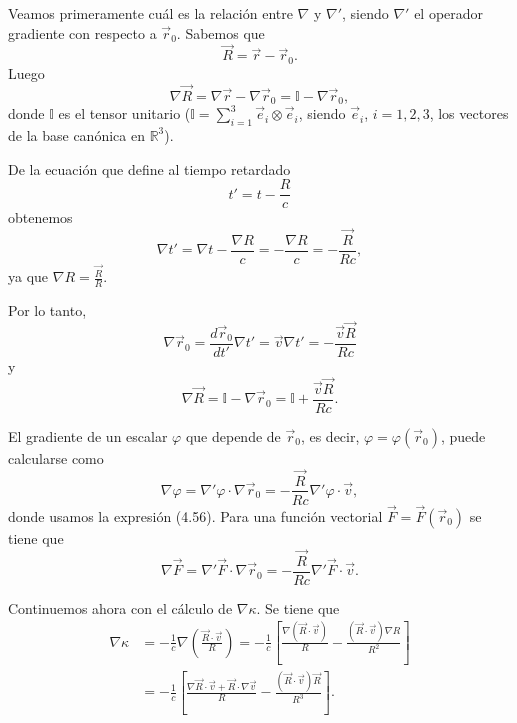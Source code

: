 \documentclass[12pt,a4paper]{book}
\begin{document}
Veamos primeramente cuál es la relación entre $\nabla$ y $\nabla'$, siendo $\nabla'$ el operador gradiente con respecto a $\vec{r}_0$. Sabemos que
\begin{equation}
\vec{R} = \vec{r} - \vec{r}_0.
\end{equation}
Luego
\begin{equation}
\nabla\vec{R} = \nabla\vec{r} - \nabla\vec{r}_0 = \mathbb{I} - \nabla\vec{r}_0,
\end{equation}
donde $\mathbb{I}$ es el tensor unitario ($\mathbb{I} = \sum_{i=1}^3 \vec{e}_i \otimes \vec{e}_i$, siendo $\vec{e}_i$, $i = 1, 2, 3$, los vectores de la base canónica en $\mathbb{R}^3$). 

De la ecuación que define al tiempo retardado
\begin{equation}
t' = t - \frac{R}{c}
\end{equation}
obtenemos
\begin{equation}
\nabla t' = \nabla t - \frac{\nabla R}{c} = -\frac{\nabla R}{c} = -\frac{\vec{R}}{Rc},
\end{equation}
ya que $\nabla R = \frac{\vec{R}}{R}$.

Por lo tanto,
\begin{equation}
\nabla\vec{r}_0 = \frac{d\vec{r}_0}{dt'}\nabla t' = \vec{v}\nabla t' = -\frac{\vec{v}\vec{R}}{Rc}
\end{equation}
y
\begin{equation}
\nabla\vec{R} = \mathbb{I} - \nabla\vec{r}_0 = \mathbb{I} + \frac{\vec{v}\vec{R}}{Rc}.
\end{equation}

El gradiente de un escalar $\varphi$ que depende de $\vec{r}_0$, es decir, $\varphi = \varphi(\vec{r}_0)$, puede calcularse como
\begin{equation}
\nabla\varphi = \nabla'\varphi \cdot \nabla\vec{r}_0 = -\frac{\vec{R}}{Rc}\nabla'\varphi \cdot \vec{v},
\end{equation}
donde usamos la expresión (4.56). Para una función vectorial $\vec{F} = \vec{F}(\vec{r}_0)$ se tiene que
\begin{equation}
\nabla\vec{F} = \nabla'\vec{F} \cdot \nabla\vec{r}_0 = -\frac{\vec{R}}{Rc}\nabla'\vec{F} \cdot \vec{v}.
\end{equation}

Continuemos ahora con el cálculo de $\nabla\kappa$. Se tiene que
\begin{align}
\nabla\kappa &= -\frac{1}{c}\nabla\left(\frac{\vec{R} \cdot \vec{v}}{R}\right) = -\frac{1}{c}\left[\frac{\nabla(\vec{R} \cdot \vec{v})}{R} - \frac{(\vec{R} \cdot \vec{v})\nabla R}{R^2}\right] \nonumber \\
&= -\frac{1}{c}\left[\frac{\nabla\vec{R} \cdot \vec{v} + \vec{R} \cdot \nabla\vec{v}}{R} - \frac{(\vec{R} \cdot \vec{v})\vec{R}}{R^3}\right].
\end{align}
\end{document}

